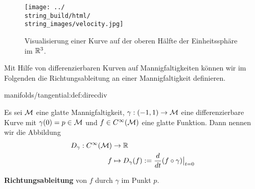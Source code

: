 \begin{figure}[htbp]
\centering


\noindent\texttt{[image: ../\\string\_build/html/\\string\_images/velocity.jpg]}
\caption{Visualisierung einer Kurve auf der oberen Hälfte der Einheitssphäre im \(\mathbb{R}^3\).}\label{\detokenize{manifolds/tangential:fig-velocity}}\end{figure}

\par
Mit Hilfe von differenzierbaren Kurven auf Mannigfaltigkeiten können wir im Folgenden die Richtungsableitung an einer Mannigfaltigkeit definieren.
\begin{definition}{}{manifolds/tangential:def:direcdiv}



\par
Es sei \(\mathcal{M}\) eine glatte Mannigfaltigkeit, \(\gamma:(-1,1)\to\mathcal{M}\) eine differenzierbare Kurve mit \(\gamma(0)=p\in\mathcal{M}\) und \(f \in C^\infty(\mathcal{M})\) eine glatte Funktion.
Dann nennen wir die Abbildung
\begin{align*}
D_\gamma : C^\infty(\mathcal{M}) &\to \mathbb{R}\\
f &\mapsto D_\gamma(f):=\frac{d}{dt}(f\circ \gamma)\big\rvert_{t=0}
\end{align*}
\par
\textbf{Richtungsableitung} von \(f\) durch \(\gamma\) im Punkt \(p\).
\end{definition}

